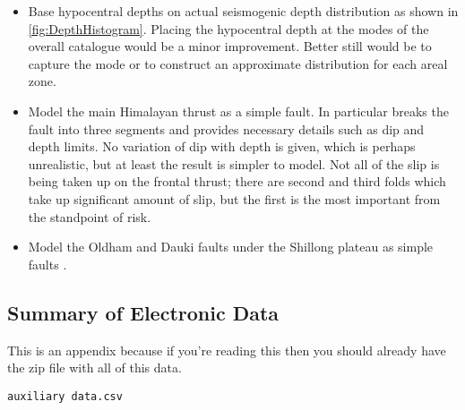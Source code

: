 \documentclass{article}
\begin{document}
\begin{appendices}
\begin{itemize}
\item Base hypocentral depths on actual seismogenic depth distribution as shown in \autoref{fig:DepthHistogram}. Placing the hypocentral depth at the modes of the overall catalogue would be a minor improvement. Better still would be to capture the mode or to construct an approximate distribution for each areal zone.
\item Model the main Himalayan thrust as a simple fault. In particular \cite{berryman2014himalayan} breaks the fault into three segments and provides necessary details such as dip and depth limits. No variation of dip with depth is given, which is perhaps unrealistic, but at least the result is simpler to model. Not all of the slip is being taken up on the frontal thrust; there are second and third folds which take up significant amount of slip, but the first is the most important from the standpoint of risk.
\item Model the Oldham and Dauki faults under the Shillong plateau as simple faults \citep{Bilham2001}.
\end{itemize}


\subsection{Summary of Electronic Data}
\label{appendix:Jobs}

This is an appendix because if you're reading this then you should already have the zip file with all of this data.

\texttt{auxiliary data.csv} 




\end{appendices}
\end{document}
